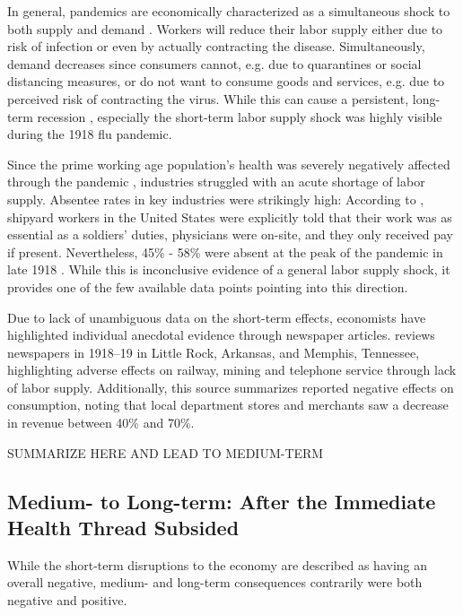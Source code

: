 \documentclass[12pt,a4paper]{article}
\begin{document}
In general, pandemics are economically characterized as a simultaneous shock to both supply and demand \citep{eichenbaumMacroeconomicsEpidemics2020}.
Workers will reduce their labor supply either due to risk of infection or even by actually contracting the disease.
Simultaneously, demand decreases since consumers cannot, e.g. due to quarantines or social distancing measures, or do not want to consume goods and services, e.g. due to perceived risk of contracting the virus. While this can cause a persistent, long-term recession \citep{eichenbaumMacroeconomicsEpidemics2020}, especially the short-term labor supply shock was highly visible during the 1918 flu pandemic.

Since the prime working age population's health was severely negatively affected through the pandemic \citep{taubenberger1918InfluenzaMother2006}, industries struggled with an acute shortage of labor supply.
Absentee rates in key industries were strikingly high: According to \cite{barryPandemicsAvoidingMistakes2009}, 
shipyard workers in the United States were explicitly told that their work was as essential as a soldiers' duties, physicians were on-site, and they only received pay if present.
Nevertheless, 45\% - 58\% were absent at the peak of the pandemic in late 1918 \citep{turnerReportPreventiveMeasure}.
While this is inconclusive evidence of a general labor supply shock, it provides one of the few available data points pointing into this direction.

Due to lack of unambiguous data on the short-term effects, economists have highlighted individual anecdotal evidence through newspaper articles.
\cite{garrettEconomicEffects19182007} reviews newspapers in 1918--19 in Little Rock, Arkansas, and Memphis, Tennessee, highlighting adverse effects on railway, mining and telephone service through lack of labor supply.
Additionally, this source summarizes reported negative effects on consumption, noting that local department stores and merchants saw a decrease in revenue between 40\% and 70\%.

SUMMARIZE HERE AND LEAD TO MEDIUM-TERM


\subsection{Medium- to Long-term: After the Immediate Health Thread Subsided} \label{sec:medlong}

While the short-term disruptions to the economy are described as having an overall negative, medium- and long-term consequences contrarily were both negative and positive.
\end{document}
